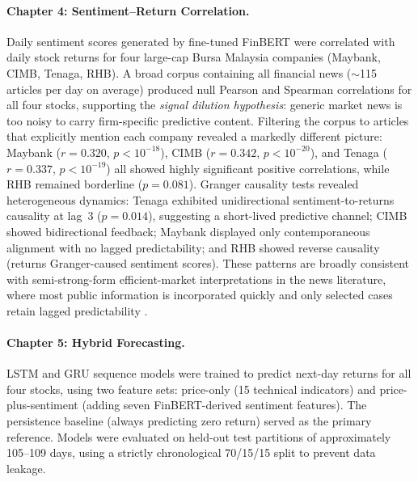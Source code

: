 \documentclass[12pt]{ucetd}
\begin{document}
\paragraph{Chapter 4: Sentiment--Return Correlation.}
Daily sentiment scores generated by fine-tuned FinBERT were correlated with daily stock returns for four large-cap Bursa Malaysia companies (Maybank, CIMB, Tenaga, RHB). A broad corpus containing all financial news ($\sim$115 articles per day on average) produced null Pearson and Spearman correlations for all four stocks, supporting the \emph{signal dilution hypothesis}: generic market news is too noisy to carry firm-specific predictive content. Filtering the corpus to articles that explicitly mention each company revealed a markedly different picture: Maybank ($r=0.320$, $p<10^{-18}$), CIMB ($r=0.342$, $p<10^{-20}$), and Tenaga ($r=0.337$, $p<10^{-19}$) all showed highly significant positive correlations, while RHB remained borderline ($p=0.081$). Granger causality tests revealed heterogeneous dynamics: Tenaga exhibited unidirectional sentiment-to-returns causality at lag~3 ($p=0.014$), suggesting a short-lived predictive channel; CIMB showed bidirectional feedback; Maybank displayed only contemporaneous alignment with no lagged predictability; and RHB showed reverse causality (returns Granger-caused sentiment scores). These patterns are broadly consistent with semi-strong-form efficient-market interpretations in the news literature, where most public information is incorporated quickly and only selected cases retain lagged predictability \cite{tetlock2007giving, atkins2018financial, davidovic2025news}.

\paragraph{Chapter 5: Hybrid Forecasting.}
LSTM and GRU sequence models were trained to predict next-day returns for all four stocks, using two feature sets: price-only (15 technical indicators) and price-plus-sentiment (adding seven FinBERT-derived sentiment features). The persistence baseline (always predicting zero return) served as the primary reference. Models were evaluated on held-out test partitions of approximately 105--109 days, using a strictly chronological 70/15/15 split to prevent data leakage.
\end{document}
